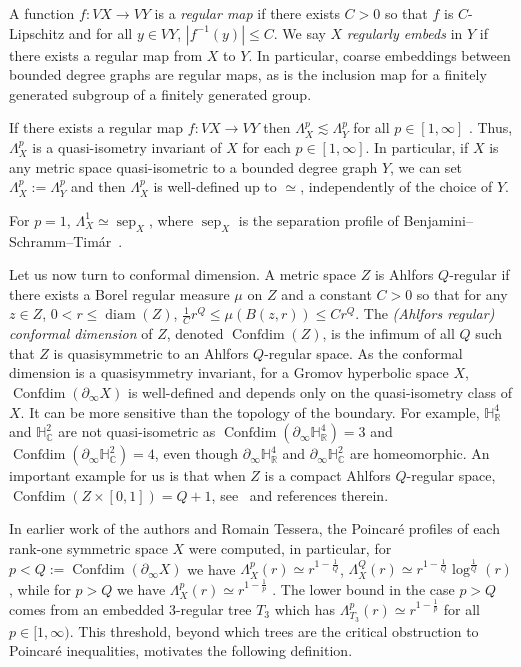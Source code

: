 \documentclass[11pt]{amsart}
\numberwithin{equation}{section}
\theoremstyle{citing}
\DeclareMathOperator{\diam}{diam}
\DeclareMathOperator{\sep}{sep}
\DeclareMathOperator{\Confdim}{Confdim}
\newcommand{\bdry}{\partial_\infty}
\newcommand{\R}{\mathbb{R}}
\newcommand{\C}{\mathbb{C}}
\newcommand{\HH}{\mathbb{H}}
\numberwithin{equation}{section}
\begin{document}
A function $f:VX \to VY$ is a \emph{regular map} if there exists $C>0$ so that $f$ is $C$-Lipschitz and for all $y \in VY$, $|f^{-1}(y)| \leq C$.  We say $X$ \emph{regularly embeds} in $Y$ if there exists a regular map from $X$ to $Y$.
In particular, coarse embeddings between bounded degree graphs are regular maps, as is the inclusion map for a finitely generated subgroup of a finitely generated group.

If there exists a regular map $f: VX \to VY$ then $\Lambda_X^p \lesssim \Lambda_Y^p$ for all $p \in [1,\infty]$ \cite{HumeMackTess-Pprof}.
Thus, $\Lambda_X^p$ is a quasi-isometry invariant of $X$ for each $p \in [1,\infty]$.  In particular, if $X$ is any metric space quasi-isometric to a bounded degree graph $Y$, we can set $\Lambda_X^p := \Lambda_Y^p$ and then $\Lambda_X^p$ is well-defined up to $\simeq$, independently of the choice of $Y$.

For $p=1$, $\Lambda_X^1 \simeq \sep_X$, where $\sep_X$ is the separation profile of Benjamini--Schramm--Tim\'ar~\cite{BenSchTim-12-separation-graphs}.

Let us now turn to conformal dimension.
A metric space $Z$ is Ahlfors $Q$-regular if there exists a Borel regular measure $\mu$ on $Z$ and a constant $C>0$ so that for any $z \in Z$, $0<r\leq \diam(Z)$, $\frac{1}{C} r^Q \leq \mu(B(z,r)) \leq Cr^Q$.
The \emph{(Ahlfors regular) conformal dimension} of $Z$, denoted $\Confdim(Z)$, is the infimum of all $Q$ such that $Z$ is quasisymmetric to an Ahlfors $Q$-regular space.
As the conformal dimension is a quasisymmetry invariant, for a Gromov hyperbolic space $X$, $\Confdim(\bdry X)$ is well-defined and depends only on the quasi-isometry class of $X$.
It can be more sensitive than the topology of the boundary. For example, $\HH_\R^4$ and $\HH_\C^2$ are not quasi-isometric as $\Confdim(\bdry \HH_\R^4)=3$ and $\Confdim(\bdry \HH_\C^2)=4$, even though $\bdry \HH_\R^4$ and $\bdry \HH_\C^2$ are homeomorphic.
An important example for us is that when $Z$ is a compact Ahlfors $Q$-regular space, $\Confdim(Z \times [0,1])=Q+1$, see~\cite[Example 4.1.9]{Mac-Tys-cdimexpo} and references therein.

In earlier work of the authors and Romain Tessera, the Poincar\'e profiles of each rank-one symmetric space $X$ were computed, in particular, for $p<Q:=\Confdim(\bdry X)$ we have $\Lambda_X^p(r) \simeq r^{1-\frac{1}{Q}}$, $\Lambda_X^Q(r) \simeq r^{1-\frac{1}{Q}}\log^{\frac{1}{Q}}(r)$, while for $p>Q$ we have $\Lambda_X^p(r) \simeq r^{1-\frac{1}{p}}$ \cite[Theorem 12]{HumeMackTess-Pprof}.
The lower bound in the case $p>Q$ comes from an embedded $3$-regular tree $T_3$ which has $\Lambda_{T_3}^p(r) \simeq r^{1-\frac{1}{p}}$ for all $p \in [1,\infty)$. This threshold, beyond which trees are the critical obstruction to Poincar\'e inequalities, motivates the following definition.
\end{document}
